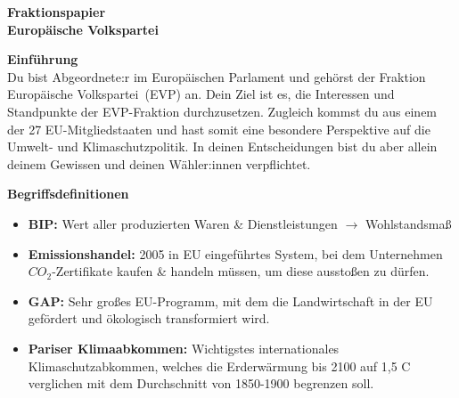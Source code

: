 \documentclass[11pt]{article}
\newcommand{\Fraktionsname}{Europäische Volkspartei}
\newcommand{\Fraktionskuerzel}{EVP}
\newcommand{\Fraktionsname}{Progressive Allianz der Sozialdemokraten}
\newcommand{\Fraktionskuerzel}{S\&D}
\newcommand{\Fraktionsname}{Renew Europe}
\newcommand{\Fraktionskuerzel}{Renew}
\newcommand{\Fraktionsname}{Die Grünen/Europäische Freie Allianz}
\newcommand{\Fraktionskuerzel}{Grüne/EFA}
\newcommand{\Fraktionsname}{Patrioten für Europa}
\newcommand{\Fraktionskuerzel}{PfE}
\newcommand{\Fraktionsname}{Die Linke}
\newcommand{\Fraktionskuerzel}{GUE/NGL}
\newcommand{\policy}{Umwelt- und Klimaschutzpolitik}
\newcommand{\glossar}{
        			\item \textbf{Emissionshandel:} 2005 in EU eingeführtes System, bei dem Unternehmen $CO_2$-Zertifikate kaufen \& handeln müssen, um diese ausstoßen zu dürfen.
        			\item \textbf{GAP:} Sehr großes EU-Programm, mit dem  die Landwirtschaft in der EU gefördert und ökologisch transformiert wird.
	        		\item \textbf{Pariser Klimaabkommen:} Wichtigstes internationales Klimaschutzabkommen, welches die Erderwärmung bis 2100 auf 1,5 \degree C verglichen mit dem Durchschnitt von 1850-1900 begrenzen soll.
        }
\newcommand{\policy}{Asylpolitik}
\newcommand{\glossar}{
        		\item \textbf{Dublin-Verordnung:} Legt fest, dass der EU-Mitgliedstaat für Asylverfahren zuständig ist, der zuerst von Asylsuchendem betreten wurde.
        		\item \textbf{Solidaritätsmechanismus:} Jeder EU-Mitgliedstaat muss einen bestimmten Anteil der Asylsuchenden aufnehmen.
        		\item \textbf{Drittstaatenverfahren:} Schutzsuchende sollen in Nicht-EU-Staaten gebracht und deren Asylantrag dort bearbeitet werden (bspw. in Albanien).
        }
\newcommand{\policy}{Außen- und Sicherheitspolitik}
\newcommand{\glossar}{
            \item \textbf{Europäische Verteidigungs-\newline agentur:} Unterstützt EU-\newline Mitgliedstaaten bei der Entwicklung ihrer militärischen Ressourcen 
            \item \textbf{Hoher Vertreter für Außen- und Sicherheitspolitik:} Vizepräsident der EU-Kommission, der als "EU-Außenminister" agiert
            \item \textbf{Rüstungskontrolle:} Internationale Vereinbarungen zur Verringerung/zum Verbot bestimmter Waffen
            \item \textbf{Verteidigungsfonds:} Geldreserve der EU, aus der Rüstungsprojekte der Mitgliedstaaten gefördert werden
     	}
\begin{document}
\vspace*{1cm}

\noindent \textbf{\huge Fraktionspapier}\\
\newline
\textbf{\huge \Fraktionsname}
\newline

\vspace{1cm}
\noindent
\begin{minipage}[t]{0.45\textwidth}
    \textbf{\Large Einführung}\\
    \newline
    Du bist Abgeordnete:r im Europäischen Parlament und gehörst der Fraktion \Fraktionsname\ (\Fraktionskuerzel) an. Dein Ziel ist es, die Interessen und Standpunkte der \Fraktionskuerzel -Fraktion durchzusetzen. Zugleich kommst du aus einem der 27 EU-Mitgliedstaaten und hast somit eine besondere Perspektive auf die \policy. In deinen Entscheidungen bist du aber allein deinem Gewissen und deinen Wähler:innen verpflichtet. \newline
    
    \vspace*{0.4cm}
    
    \textbf{\Large Begriffsdefinitionen}\\
    \raggedright
    \vspace{-0.5cm}
    \begin{itemize}
        \item \textbf{BIP:} Wert aller produzierten Waren \& Dienstleistungen $\to$ Wohlstandsmaß
        \glossar
    \end{itemize}
\end{minipage}%
\hfill
\end{document}
